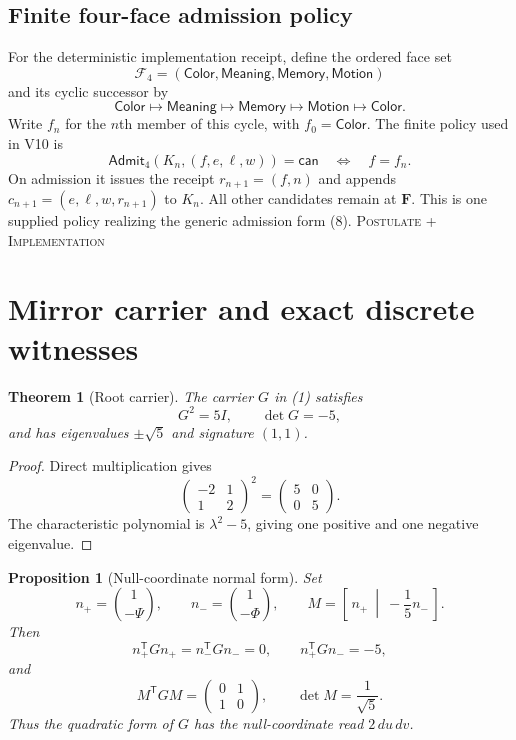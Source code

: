 \documentclass[10pt]{article}
\newtheorem{theorem}[definition]{Theorem}
\newtheorem{proposition}[definition]{Proposition}
\theoremstyle{remark}
\newcommand{\Admit}{\mathsf{Admit}}
\newcommand{\cstatus}[1]{\hfill\textsc{#1}}
\newcommand{\postulate}{\textsc{Postulate}}
\newcommand{\implementation}{\textsc{Implementation}}
\newcommand{\Face}{\mathcal F_4}
\begin{document}
\subsection{Finite four-face admission policy}

For the deterministic implementation receipt, define the ordered face set
\[
 \Face=(\mathsf{Color},\mathsf{Meaning},\mathsf{Memory},\mathsf{Motion})
\]
and its cyclic successor by
\[
 \mathsf{Color}\mapsto\mathsf{Meaning}\mapsto\mathsf{Memory}
 \mapsto\mathsf{Motion}\mapsto\mathsf{Color}.
\]
Write $f_n$ for the $n$th member of this cycle, with
$f_0=\mathsf{Color}$.  The finite policy used in V10 is
\[
 \Admit_4(K_n,(f,e,\ell,w))=\mathsf{can}
 \quad\Longleftrightarrow\quad f=f_n.
\]
On admission it issues the receipt $r_{n+1}=(f,n)$ and appends
$c_{n+1}=(e,\ell,w,r_{n+1})$ to $K_n$.  All other candidates remain at
$\mathbf F$.  This is one supplied policy realizing the generic admission
form (8). \cstatus{\postulate\; + \implementation}

\section{Mirror carrier and exact discrete witnesses}

\begin{theorem}[Root carrier]\label{thm:root}
The carrier $G$ in (1) satisfies
\[
 G^2=5I,\qquad \det G=-5,
\tag{9}
\]
and has eigenvalues $\pm\sqrt5$ and signature $(1,1)$.
\end{theorem}

\begin{proof}
Direct multiplication gives
\[
 \begin{pmatrix}-2&1\\1&2\end{pmatrix}^2=
 \begin{pmatrix}5&0\\0&5\end{pmatrix}.
\]
The characteristic polynomial is $\lambda^2-5$, giving one positive and one
negative eigenvalue.
\end{proof}

\begin{proposition}[Null-coordinate normal form]\label{prop:null}
Set
\[
 n_+=\binom{1}{-\Psi},\qquad n_-=\binom{1}{-\Phi},\qquad
 M=\left[\,n_+\ \middle|\ -\frac15n_-\,\right].
\tag{10}
\]
Then
\[
 n_+^{\mathsf T}Gn_+=n_-^{\mathsf T}Gn_-=0,\qquad
 n_+^{\mathsf T}Gn_-=-5,
\tag{11}
\]
and
\[
 M^{\mathsf T}GM=\begin{pmatrix}0&1\\1&0\end{pmatrix},\qquad
 \det M=\frac1{\sqrt5}.
\tag{12}
\]
Thus the quadratic form of $G$ has the null-coordinate read $2\,du\,dv$.
\end{proposition}
\end{document}
